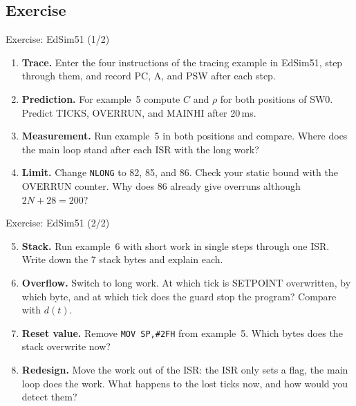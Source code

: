 \subsection{Exercise}
\begin{frame}{Exercise: EdSim51 (1/2)}
  \begin{enumerate}
    \item \textbf{Trace.} Enter the four instructions of the tracing example in EdSim51, step through them, and record PC, A, and PSW after each step.
    \item \textbf{Prediction.} For example~5 compute $C$ and $\rho$ for both positions of SW0. Predict TICKS, OVERRUN, and MAINHI after 20\,ms.
    \item \textbf{Measurement.} Run example~5 in both positions and compare. Where does the main loop stand after each ISR with the long work?
    \item \textbf{Limit.} Change \texttt{NLONG} to 82, 85, and 86. Check your static bound with the OVERRUN counter. Why does 86 already give overruns although $2N + 28 = 200$?
  \end{enumerate}
\end{frame}

\begin{frame}{Exercise: EdSim51 (2/2)}
  \begin{enumerate}
    \setcounter{enumi}{4}
    \item \textbf{Stack.} Run example~6 with short work in single steps through one ISR. Write down the 7 stack bytes and explain each.
    \item \textbf{Overflow.} Switch to long work. At which tick is SETPOINT overwritten, by which byte, and at which tick does the guard stop the program? Compare with $d(t)$.
    \item \textbf{Reset value.} Remove \texttt{MOV SP,\#2FH} from example~5. Which bytes does the stack overwrite now?
    \item \textbf{Redesign.} Move the work out of the ISR: the ISR only sets a flag, the main loop does the work. What happens to the lost ticks now, and how would you detect them?
  \end{enumerate}
\end{frame}

